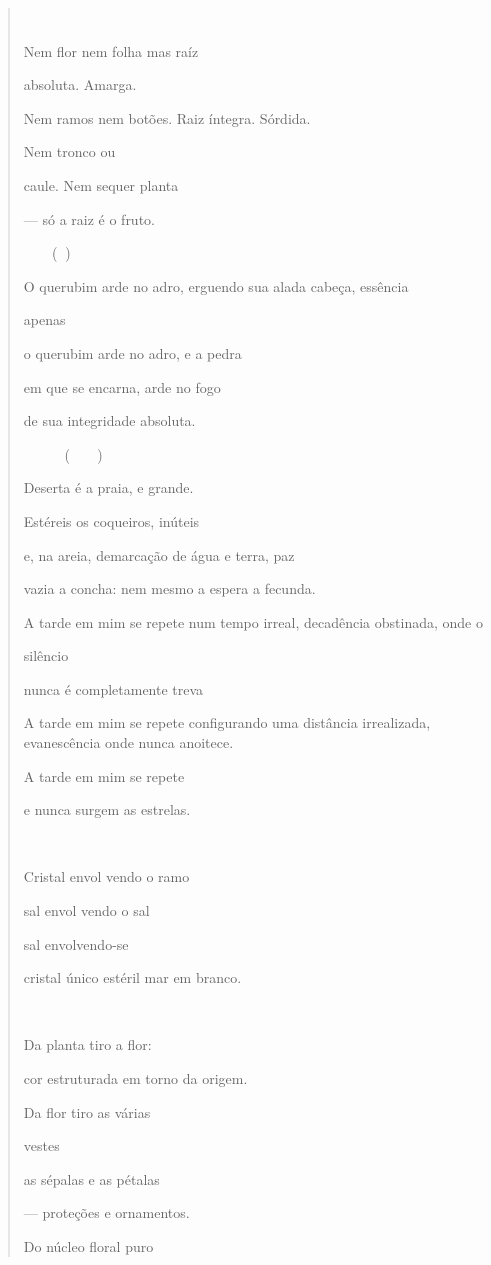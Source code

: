 \begin{quote}


Nem flor nem folha mas raíz

absoluta. Amarga.

Nem ramos nem botões. Raiz íntegra. Sórdida.

Nem tronco ou

caule. Nem sequer planta

--- só a raiz é o fruto.

 ()

O querubim arde no adro, erguendo sua alada cabeça, essência

apenas

o querubim arde no adro, e a pedra

em que se encarna, arde no fogo

de sua integridade absoluta.

  ()

Deserta é a praia, e grande.

Estéreis os coqueiros, inúteis

e, na areia, demarcação de água e terra, paz

vazia a concha: nem mesmo a espera a fecunda.

A tarde em mim se repete num tempo irreal, decadência obstinada, onde o

silêncio

nunca é completamente treva

A tarde em mim se repete configurando uma distância irrealizada,
evanescência onde nunca anoitece.

A tarde em mim se repete

e nunca surgem as estrelas.



Cristal envol vendo o ramo

sal envol vendo o sal

sal envolvendo-se

cristal único estéril mar em branco.



Da planta tiro a flor:

cor estruturada em torno da origem.

Da flor tiro as várias

vestes

as sépalas e as pétalas

--- proteções e ornamentos.

Do núcleo floral puro


\end{quote}
